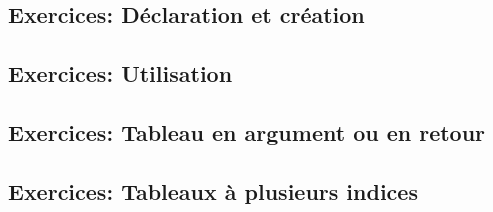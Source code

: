 \subsection{Exercices: Déclaration et création}
\subsection{Exercices: Utilisation}
\subsection{Exercices: Tableau en argument ou en retour}
\subsection{Exercices: Tableaux à plusieurs indices}
